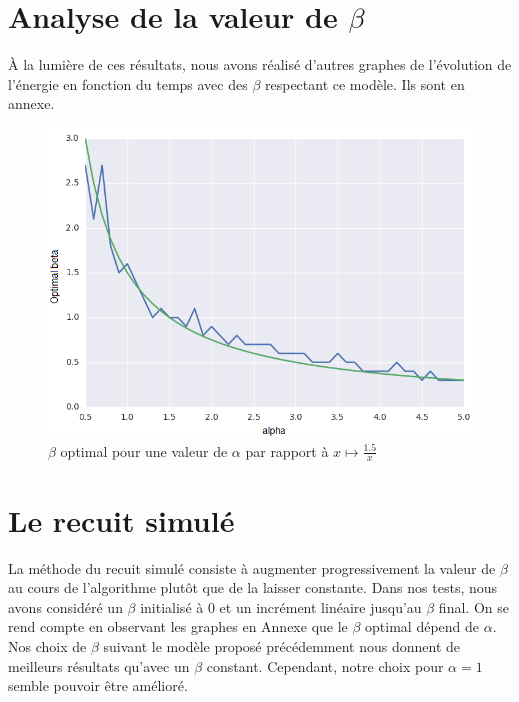 \documentclass[twocolumn]{article}
\begin{document}
	\section{Analyse de la valeur de $\beta$}
		À la lumière de ces résultats, nous avons réalisé d'autres graphes de l'évolution de l'énergie en fonction du temps avec des $\beta$ respectant ce modèle. Ils sont en annexe.
	\begin{figure}
		\includegraphics[width=\columnwidth]{../tobekept/exbonus1_2323132067031870085png-r.png}
		\caption{\label{ex3}$\beta$ optimal pour une valeur de $\alpha$ par rapport à $x\mapsto \frac{1.5}{x}$}
	\end{figure}
	\section{Le recuit simulé}
		La méthode du recuit simulé consiste à augmenter progressivement la valeur de $\beta$ au cours de l'algorithme plutôt que de la laisser constante. Dans nos tests, nous avons considéré un $\beta$ initialisé à 0 et un incrément linéaire jusqu'au $\beta$ final.
		On se rend compte en observant les graphes en Annexe que le $\beta$ optimal dépend de $\alpha$.  Nos choix de $\beta$ suivant le modèle proposé précédemment nous donnent de meilleurs résultats qu'avec un $\beta$ constant. Cependant, notre choix pour $\alpha = 1$ semble pouvoir être amélioré.
		
\end{document}
